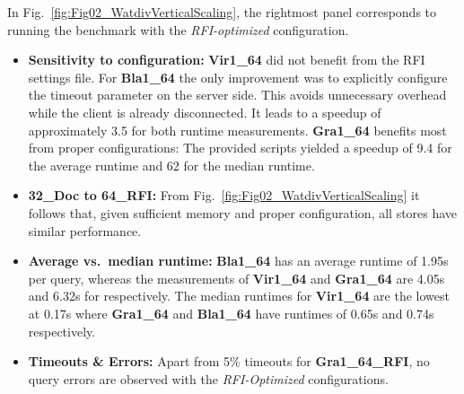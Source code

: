 %


In Fig.~\ref{fig:Fig02_WatdivVerticalScaling}, the rightmost panel corresponds to running the benchmark with the \emph{RFI-optimized} configuration.

%
%
%
\begin{itemize}
	\item \textbf{Sensitivity to configuration:} \textbf{Vir1\_64} did not benefit from the RFI settings file. For \textbf{Bla1\_64} the only improvement was to explicitly configure the timeout parameter on the server side. This avoids unnecessary overhead while the client is already disconnected. It leads to a speedup of approximately 3.5 for both runtime measurements. \textbf{Gra1\_64} benefits most from proper configurations: The provided scripts yielded a speedup of 9.4 for the average runtime and 62 for the median runtime.
	\item \textbf{32\_Doc to 64\_RFI:} From Fig.~\ref{fig:Fig02_WatdivVerticalScaling} it follows that, given sufficient memory and proper configuration, all stores have similar performance.
	\item \textbf{Average vs.\ median runtime:} \textbf{Bla1\_64} has an average runtime of 1.95s per query, whereas the measurements of \textbf{Vir1\_64} and \textbf{Gra1\_64} are 4.05s and 6.32s for  respectively. The median runtimes for \textbf{Vir1\_64} are the lowest at 0.17s where \textbf{Gra1\_64} and \textbf{Bla1\_64} have runtimes of 0.65s and 0.74s respectively.
\item \textbf{Timeouts \& Errors:} Apart from 5\% timeouts for \textbf{Gra1\_64\_RFI}, no query errors are observed with the \emph{RFI-Optimized} configurations.
\end{itemize}

